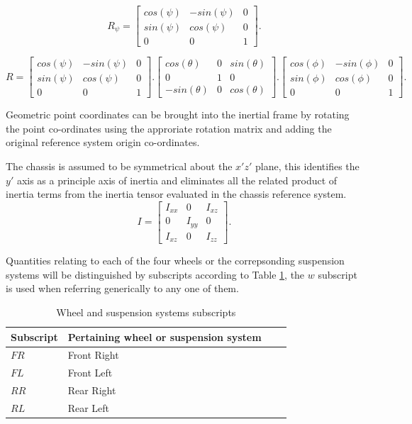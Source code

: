 $$
R_\psi = \begin{bmatrix}
cos(\psi) & -sin(\psi)      & 0\\
sin(\psi) & cos(\psi) & 0     \\
0 & 0      & 1
\end{bmatrix}.
$$

$$
R = \begin{bmatrix}
cos(\psi) & -sin(\psi)      & 0\\
sin(\psi) & cos(\psi) & 0     \\
0 & 0      & 1
\end{bmatrix}.\begin{bmatrix}
cos(\theta) & 0      & sin(\theta) \\
0 & 1 & 0  \\
-sin(\theta) & 0 & cos(\theta)
\end{bmatrix}.\begin{bmatrix}
cos(\phi) & -sin(\phi)      & 0\\
sin(\phi) & cos(\phi) & 0     \\
0 & 0      & 1
\end{bmatrix}.
$$

Geometric point coordinates can be brought into the inertial frame by rotating the point co-ordinates using the approriate rotation matrix and adding the original reference system origin co-ordinates.

The chassis is assumed to be symmetrical about the $x'z'$ plane, this identifies the $y'$ axis as a principle axis of inertia and eliminates all the related product of inertia terms from the inertia tensor evaluated in the chassis reference system.
$$
I = \begin{bmatrix}
I_{xx} & 0      & I_{xz}\\
0      & I_{yy} & 0     \\
I_{xz} & 0      & I_{zz}
\end{bmatrix}.
$$

Quantities relating to each of the four wheels or the correpsonding suspension systems will be distinguished by subscripts according to Table \ref{table:subscripts}, the $w$ subscript is used when referring generically to any one of them.

\begin{table}[ht]
  \caption{Wheel and suspension systems subscripts} %
  \centering %
  \begin{tabular}{l l l l} %
    \hline\hline %
    Subscript & Pertaining wheel or suspension system \\ [0.5ex] %
    \hline %
    $FR$ & Front Right \\ %
    $FL$ & Front Left \\
    $RR$ & Rear Right \\
    $RL$ & Rear Left \\ [1ex] %
    \hline %
  \end{tabular}
  \label{table:subscripts} %
\end{table}

